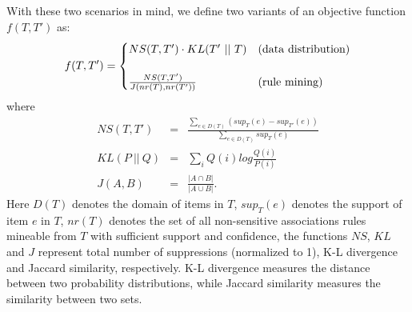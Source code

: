 With these two scenarios in mind, we define two variants of an objective function $f(T, T')$ as:
\begin{equation}
f(T, T') =
\begin{cases}
NS(T, T')\cdot KL(T'~||~T) & \rm{(data~ distribution)} \\
& \\
\frac{NS(T, T')}{J(nr(T), nr(T'))} & \rm{(rule~ mining)}
\end{cases}
\end{equation}
where
\begin{eqnarray}
NS(T,T') &=& \frac{\sum_{e\in D(T)}(sup_T(e) - sup_{T'}(e))}{\sum_{e\in D(T)}sup_{T}(e)} \\
KL(P~||~Q)&=&\sum_{i}Q(i)log\frac{Q(i)}{P(i)} \label{eq:kl}\\
J(A, B) &=& \frac{|A \cap B|}{|A \cup B|}.
\label{eq:kl-dis}
\end{eqnarray}
Here $D(T)$ denotes the domain of items in $T$, $sup_T(e)$ denotes the
support of item $e$ in $T$, $nr(T)$ denotes the set of all non-sensitive
associations rules mineable from $T$ with sufficient support and confidence,
the functions $NS$, $KL$ and $J$ represent 
total number of suppressions (normalized to 1), 
K-L divergence\cite{kl-divergence} and 
Jaccard similarity\cite{jaccard-sim}, respectively. K-L
divergence measures the distance between two probability distributions, while
Jaccard similarity measures the similarity between two sets.
%
%
%



